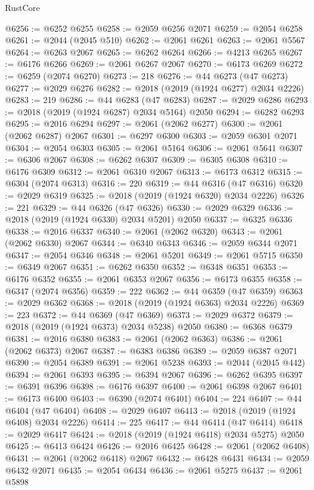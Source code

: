 \begin{lexlean}{RustCore}
\begin{coremodule}
@6256 := @6252 @6255
@6258 := @2059 @6256 @2071
@6259 := @2054 @6258
@6261 := @2044 (@2045 @510)
@6262 := @2061 @6261
@6263 := @2061 @5567
@6264 := @6263 @2067
@6265 := @6262 @6264
@6266 := @4213 @6265
@6267 := @6176 @6266
@6269 := @2061 @6267 @2067
@6270 := @6173 @6269
@6272 := @6259 (@2074 @6270)
@6273 := 218
@6276 := @44 @6273 (@47 @6273)
@6277 := @2029 @6276
@6282 := @2018 (@2019 (@1924 @6277) @2034 @2226)
@6283 := 219
@6286 := @44 @6283 (@47 @6283)
@6287 := @2029 @6286
@6293 := @2018 (@2019 (@1924 @6287) @2034 @5164) @2050
@6294 := @6282 @6293
@6295 := @2016 @6294
@6297 := @2061 (@2062 @6277)
@6300 := @2061 (@2062 @6287) @2067
@6301 := @6297 @6300
@6303 := @2059 @6301 @2071
@6304 := @2054 @6303
@6305 := @2061 @5164
@6306 := @2061 @5641
@6307 := @6306 @2067
@6308 := @6262 @6307
@6309 := @6305 @6308
@6310 := @6176 @6309
@6312 := @2061 @6310 @2067
@6313 := @6173 @6312
@6315 := @6304 (@2074 @6313)
@6316 := 220
@6319 := @44 @6316 (@47 @6316)
@6320 := @2029 @6319
@6325 := @2018 (@2019 (@1924 @6320) @2034 @2226)
@6326 := 221
@6329 := @44 @6326 (@47 @6326)
@6330 := @2029 @6329
@6336 := @2018 (@2019 (@1924 @6330) @2034 @5201) @2050
@6337 := @6325 @6336
@6338 := @2016 @6337
@6340 := @2061 (@2062 @6320)
@6343 := @2061 (@2062 @6330) @2067
@6344 := @6340 @6343
@6346 := @2059 @6344 @2071
@6347 := @2054 @6346
@6348 := @2061 @5201
@6349 := @2061 @5715
@6350 := @6349 @2067
@6351 := @6262 @6350
@6352 := @6348 @6351
@6353 := @6176 @6352
@6355 := @2061 @6353 @2067
@6356 := @6173 @6355
@6358 := @6347 (@2074 @6356)
@6359 := 222
@6362 := @44 @6359 (@47 @6359)
@6363 := @2029 @6362
@6368 := @2018 (@2019 (@1924 @6363) @2034 @2226)
@6369 := 223
@6372 := @44 @6369 (@47 @6369)
@6373 := @2029 @6372
@6379 := @2018 (@2019 (@1924 @6373) @2034 @5238) @2050
@6380 := @6368 @6379
@6381 := @2016 @6380
@6383 := @2061 (@2062 @6363)
@6386 := @2061 (@2062 @6373) @2067
@6387 := @6383 @6386
@6389 := @2059 @6387 @2071
@6390 := @2054 @6389
@6391 := @2061 @5238
@6393 := @2044 (@2045 @442)
@6394 := @2061 @6393
@6395 := @6394 @2067
@6396 := @6262 @6395
@6397 := @6391 @6396
@6398 := @6176 @6397
@6400 := @2061 @6398 @2067
@6401 := @6173 @6400
@6403 := @6390 (@2074 @6401)
@6404 := 224
@6407 := @44 @6404 (@47 @6404)
@6408 := @2029 @6407
@6413 := @2018 (@2019 (@1924 @6408) @2034 @2226)
@6414 := 225
@6417 := @44 @6414 (@47 @6414)
@6418 := @2029 @6417
@6424 := @2018 (@2019 (@1924 @6418) @2034 @5275) @2050
@6425 := @6413 @6424
@6426 := @2016 @6425
@6428 := @2061 (@2062 @6408)
@6431 := @2061 (@2062 @6418) @2067
@6432 := @6428 @6431
@6434 := @2059 @6432 @2071
@6435 := @2054 @6434
@6436 := @2061 @5275
@6437 := @2061 @5898

\end{coremodule}
\end{lexlean}
